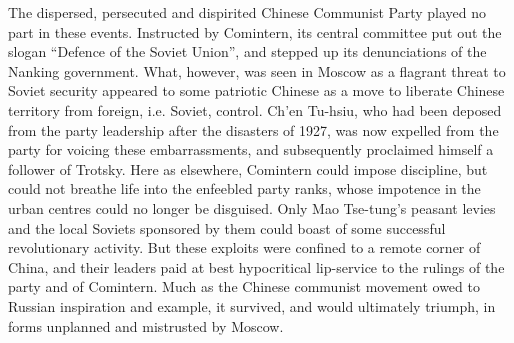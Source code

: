 The dispersed, persecuted and dispirited Chinese Communist Party played no part in these events. Instructed by Comintern, its central committee put out the slogan ``Defence of the Soviet Union'', and stepped up its denunciations of the Nanking government. What, however, was seen in Moscow as a flagrant threat to Soviet security appeared to some patriotic Chinese as a move to liberate Chinese territory from foreign, i.e. Soviet, control. Ch'en Tu-hsiu, who had been deposed from the party leadership after the disasters of 1927, was now expelled from the party for voicing these embarrassments, and subsequently proclaimed himself a follower of Trotsky. Here as elsewhere, Comintern could impose discipline, but could not breathe life into the enfeebled party ranks, whose impotence in the urban centres could no longer be disguised. Only Mao Tse-tung's peasant levies and the local Soviets sponsored by them could boast of some successful revolutionary activity. But these exploits were confined to a remote corner of China, and their leaders paid at best hypocritical lip-service to the rulings of the party and of Comintern. Much as the Chinese communist movement owed to Russian inspiration and example, it survived, and would ultimately triumph, in forms unplanned and mistrusted by Moscow.
